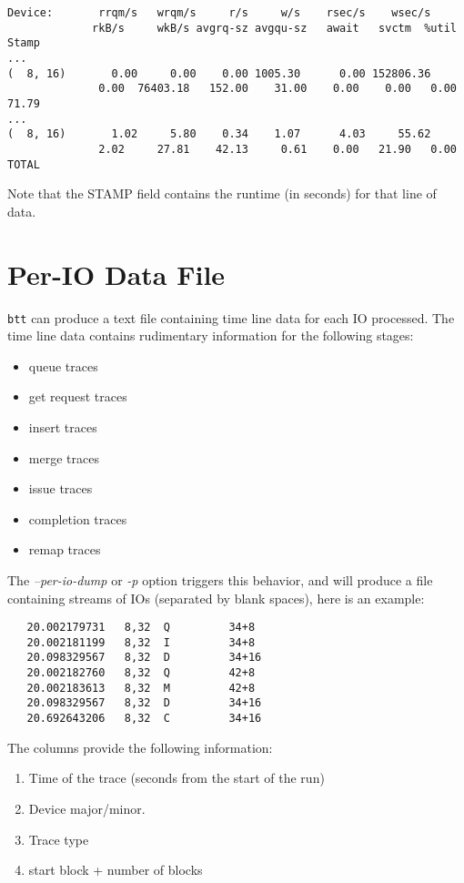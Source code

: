 \documentclass{article}
\begin{document}
\begin{verbatim}
Device:       rrqm/s   wrqm/s     r/s     w/s    rsec/s    wsec/s
             rkB/s     wkB/s avgrq-sz avgqu-sz   await   svctm  %util   Stamp
...
(  8, 16)       0.00     0.00    0.00 1005.30      0.00 152806.36      
              0.00  76403.18   152.00    31.00    0.00    0.00   0.00   71.79
...
(  8, 16)       1.02     5.80    0.34    1.07      4.03     55.62
              2.02     27.81    42.13     0.61    0.00   21.90   0.00   TOTAL
\end{verbatim}

  Note that the STAMP field contains the runtime (in seconds) for that
  line of data.

\newpage\section{\label{sec:per-io}Per-IO Data File}

  \texttt{btt} can produce a text file containing time line data for each
  IO processed. The time line data contains rudimentary information for
  the following stages:

  \begin{itemize}
    \item queue traces
    \item get request traces
    \item insert traces
    \item merge traces
    \item issue traces
    \item completion traces
    \item remap traces
  \end{itemize}

  The \emph{--per-io-dump} or \emph{-p} option triggers this behavior,
  and will produce a file containing streams of IOs (separated by blank
  spaces), here is an example:

\begin{verbatim}
   20.002179731   8,32  Q         34+8
   20.002181199   8,32  I         34+8
   20.098329567   8,32  D         34+16
   20.002182760   8,32  Q         42+8
   20.002183613   8,32  M         42+8
   20.098329567   8,32  D         34+16
   20.692643206   8,32  C         34+16
\end{verbatim}

  The columns provide the following information:

  \begin{enumerate}
    \item Time of the trace (seconds from the start of the run)

    \item Device major/minor.

    \item Trace type 

    \item start block + number of blocks
  \end{enumerate}
  
\end{document}
